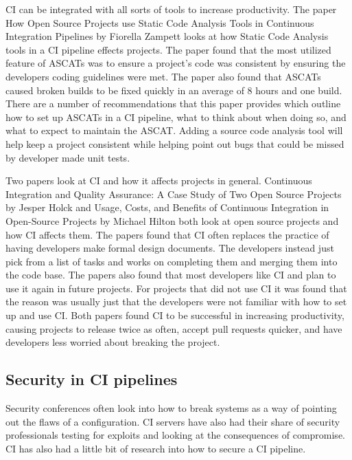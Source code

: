 	CI can be integrated with all sorts of tools to increase productivity. The paper How Open Source Projects use Static Code Analysis Tools in Continuous Integration Pipelines by Fiorella Zampett 
    looks at how Static Code Analysis tools in a CI pipeline effects projects\cite{Zampetti}. The paper found that the most utilized feature of ASCATs was to ensure a project's code was consistent 
    by ensuring the developers coding guidelines were met. The paper also found that ASCATs caused broken builds to be fixed quickly in an average of 8 hours and one build. There are a number of 
    recommendations that this paper provides which outline how to set up ASCATs in a CI pipeline, what to think about when doing so, and what to expect to maintain the ASCAT. Adding a source code 
    analysis tool will help keep a project consistent while helping point out bugs that could be missed by developer made unit tests.

	Two papers look at CI and how it affects projects in general. Continuous Integration and Quality Assurance: A Case Study of Two Open Source Projects by Jesper Holck and Usage, Costs, and Benefits
    of Continuous Integration in Open-Source Projects by Michael Hilton both look at open source projects and how CI affects them\cite{Hilton,Holck}. The papers found that CI often replaces the 
    practice of having developers make formal design documents. The developers instead just pick from a list of tasks and works on completing them and merging them into the code base. The papers also
    found that most developers like CI and plan to use it again in future projects. For projects that did not use CI it was found that the reason was usually just that the developers were not 
    familiar with how to set up and use CI. Both papers found CI to be successful in increasing productivity, causing projects to release twice as often, accept pull requests quicker, and have 
    developers less worried about breaking the project. 

\subsection{Security in CI pipelines}
	Security conferences often look into how to break systems as a way of pointing out the flaws of a configuration. CI servers have also had their share of security professionals testing for exploits
    and looking at the consequences of compromise. CI has also had a little bit of research into how to secure a CI pipeline.

